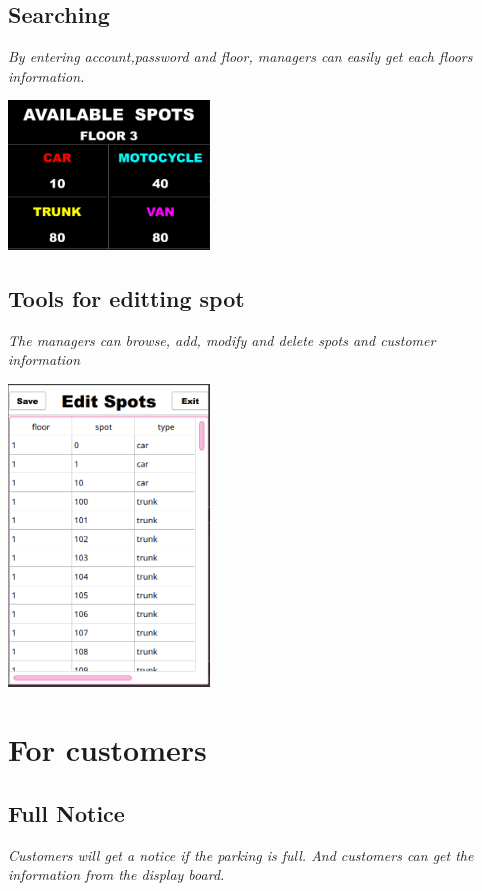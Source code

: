{	\subsection{Searching}
	{\slshape \selectfont\huge
		By entering account,password and floor, managers can easily get each floors information.
		\begin{center}
			\centering
			\includegraphics[width=0.4\textwidth]{pics/Floor3.png}
		\end{center}
	\vspace{10cm}
	\subsection{Tools for editting spot}
	{\slshape \selectfont
	\huge The managers can browse, add, modify and delete spots and customer information
	\begin{center}
	\centering
	\includegraphics[width=0.4\textwidth]{pics/Edit.png}
	\end{center}
	}
	\newpage
	\section{For customers}
	\subsection{Full Notice}
	{\slshape \selectfont
		\huge Customers will get a notice if the parking is full.
		      And customers can get the information from the display board.
	}
}}
